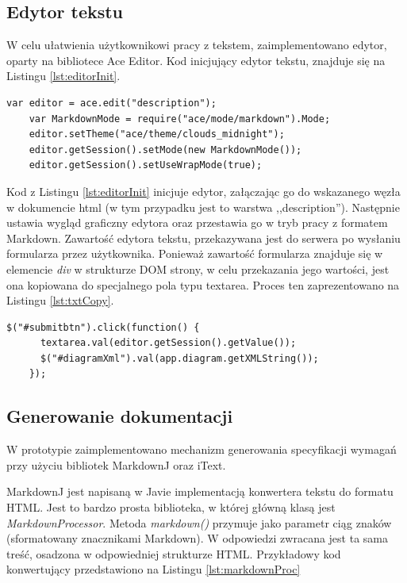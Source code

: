     \subsection{Edytor tekstu}
      W celu ułatwienia użytkownikowi pracy z tekstem, zaimplementowano edytor, oparty na bibliotece Ace Editor. 
      Kod inicjujący edytor tekstu, znajduje się na Listingu \ref{lst:editorInit}.

    \begin{lstlisting}[caption={Inicjalizacja edytora tekstu}, label={lst:editorInit}]
    var editor = ace.edit("description");
    var MarkdownMode = require("ace/mode/markdown").Mode;
    editor.setTheme("ace/theme/clouds_midnight");
    editor.getSession().setMode(new MarkdownMode());
    editor.getSession().setUseWrapMode(true);
    \end{lstlisting}

    Kod z Listingu \ref{lst:editorInit} inicjuje edytor, załączając go do wskazanego węzła w dokumencie html (w tym przypadku jest to warstwa ,,description''). Następnie ustawia wygląd graficzny edytora oraz przestawia go w tryb pracy z formatem Markdown.
    Zawartość edytora tekstu, przekazywana jest do serwera po wysłaniu formularza przez użytkownika. Ponieważ zawartość formularza znajduje się w elemencie \emph{div} w strukturze DOM strony, w celu przekazania jego wartości, jest ona kopiowana do specjalnego pola typu textarea. Proces ten zaprezentowano na Listingu \ref{lst:txtCopy}.

    \begin{lstlisting}[caption={Kopiowanie zawartości edytora tekstu do pola textarea}, label={lst:txtCopy}]
    $("#submitbtn").click(function() {
      textarea.val(editor.getSession().getValue()); 
      $("#diagramXml").val(app.diagram.getXMLString());
    });
    \end{lstlisting} 

    \subsection{Generowanie dokumentacji}
      
      W prototypie zaimplementowano mechanizm generowania specyfikacji wymagań przy użyciu bibliotek MarkdownJ oraz iText.

      MarkdownJ jest napisaną w Javie implementacją konwertera tekstu do formatu HTML. Jest to bardzo prosta biblioteka, w której główną klasą jest \emph{MarkdownProcessor}. Metoda \emph{markdown()} przymuje jako parametr ciąg znaków (sformatowany znacznikami Markdown). W odpowiedzi zwracana jest ta sama treść, osadzona w odpowiedniej strukturze HTML. Przykładowy kod konwertujący przedstawiono na Listingu \ref{lst:markdownProc}


